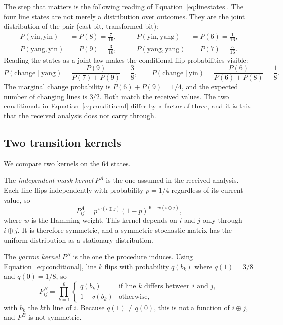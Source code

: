 \documentclass[11pt,a4paper]{article}
\newcommand{\xor}{\oplus}
\begin{document}
The step that matters is the following reading of
Equation~\eqref{eq:linestates}. The four line states are not merely a
distribution over outcomes. They are the joint distribution of the pair
(cast bit, transformed bit):
\begin{equation}
\begin{aligned}
P(\text{yin},\text{yin}) &= P(8) = \tfrac{7}{16}, &\qquad
P(\text{yin},\text{yang}) &= P(6) = \tfrac{1}{16}, \\
P(\text{yang},\text{yin}) &= P(9) = \tfrac{3}{16}, &\qquad
P(\text{yang},\text{yang}) &= P(7) = \tfrac{5}{16}.
\end{aligned}
\label{eq:joint}
\end{equation}
Reading the states as a joint law makes the conditional flip probabilities
visible:
\begin{equation}
P(\text{change} \mid \text{yang}) = \frac{P(9)}{P(7)+P(9)} = \frac{3}{8},
\qquad
P(\text{change} \mid \text{yin}) = \frac{P(6)}{P(6)+P(8)} = \frac{1}{8}.
\label{eq:conditional}
\end{equation}
The marginal change probability is
$P(6) + P(9) = 1/4$, and the expected number of changing lines is $3/2$. Both
match the received values. The two conditionals in
Equation~\eqref{eq:conditional} differ by a factor of three, and it is this that
the received analysis does not carry through.

\subsection{Two transition kernels}
\label{sec:kernels}

We compare two kernels on the $64$ states.

The \emph{independent-mask kernel} $P^{A}$ is the one assumed in the received
analysis. Each line flips independently with probability $p = 1/4$ regardless of
its current value, so
\begin{equation}
P^{A}_{ij} = p^{\,w(i \xor j)} (1-p)^{\,6 - w(i \xor j)},
\label{eq:kernelA}
\end{equation}
where $w$ is the Hamming weight. This kernel depends on $i$ and $j$ only through
$i \xor j$. It is therefore symmetric, and a symmetric stochastic matrix has the
uniform distribution as a stationary distribution.

The \emph{yarrow kernel} $P^{B}$ is the one the procedure induces. Using
Equation~\eqref{eq:conditional}, line $k$ flips with probability
$q(b_k)$ where $q(1) = 3/8$ and $q(0) = 1/8$, so
\begin{equation}
P^{B}_{ij} = \prod_{k=1}^{6}
\begin{cases}
q(b_k) & \text{if line $k$ differs between $i$ and $j$},\\
1 - q(b_k) & \text{otherwise},
\end{cases}
\label{eq:kernelB}
\end{equation}
with $b_k$ the $k$th line of $i$. Because $q(1) \neq q(0)$, this is not a
function of $i \xor j$, and $P^{B}$ is not symmetric.
\end{document}
